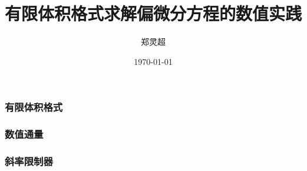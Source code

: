 \documentclass[8pt,mathserif]{beamer}
\begin{document}
\title[]{
{
有限体积格式求解偏微分方程的数值实践
}
}

\author[郑灵超]{
  \normalsize  郑灵超}

\date[\today]{\today}


\frame{\titlepage}



\begin{frame}
  \frametitle{有限体积格式}

\end{frame}

\begin{frame}
  \frametitle{数值通量}
\end{frame}


\begin{frame}
  \frametitle{斜率限制器}
\end{frame}
\end{document}
